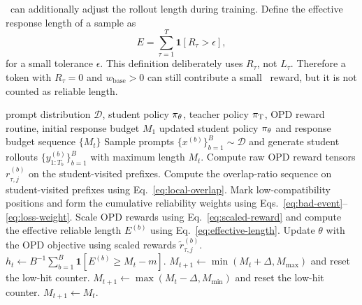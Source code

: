 \method~can additionally adjust the rollout length during training.
Define the effective response length of a sample as
\begin{equation}
    E = \sum_{\tau=1}^{T} \mathbf{1}\left[R_{\tau}>\epsilon\right],
    \label{eq:effective-length}
\end{equation}
for a small tolerance $\epsilon$.
This definition deliberately uses $R_{\tau}$, not $L_{\tau}$.
Therefore a token with $R_{\tau}=0$ and $w_{\mathrm{base}}>0$ can still contribute a small \opd~reward, but it is not counted as reliable length.




\begin{algorithm}[t]
\caption{\method~with reliability-aware reward scaling and dynamic response budget}
\label{alg:prune-opd}
\begin{algorithmic}[1]
\Require prompt distribution $\mathcal{D}$, student policy $\pi_{\theta}$, teacher policy $\pi_{\mathrm{T}}$, OPD reward routine, initial response budget $M_1$
\Ensure updated student policy $\pi_{\theta}$ and response budget sequence $\{M_t\}$
    \State Sample prompts $\{x^{(b)}\}_{b=1}^{B}\sim\mathcal{D}$ and generate student rollouts $\{y^{(b)}_{1:T_b}\}_{b=1}^{B}$ with maximum length $M_t$.
    \State Compute raw OPD reward tensors $r^{(b)}_{\tau,j}$ on the student-visited prefixes.
        \State Compute the overlap-ratio sequence on student-visited prefixes using Eq.~\eqref{eq:local-overlap}.
        \State Mark low-compatibility positions and form the cumulative reliability weights using Eqs.~\eqref{eq:bad-event}--\eqref{eq:loss-weight}.
        \State Scale OPD rewards using Eq.~\eqref{eq:scaled-reward} and compute the effective reliable length $E^{(b)}$ using Eq.~\eqref{eq:effective-length}.
    \EndFor
    \State Update $\theta$ with the OPD objective using scaled rewards $\widetilde{r}^{(b)}_{\tau,j}$.
    \State $h_t\leftarrow B^{-1}\sum_{b=1}^{B}\mathbf{1}[E^{(b)}\geq M_t-m]$.
        \State $M_{t+1}\leftarrow \min(M_t+\Delta,M_{\max})$ and reset the low-hit counter.
        \State $M_{t+1}\leftarrow \max(M_t-\Delta,M_{\min})$ and reset the low-hit counter.
    \Else
        \State $M_{t+1}\leftarrow M_t$.
    \EndIf
\EndFor
\end{algorithmic}
\end{algorithm}

